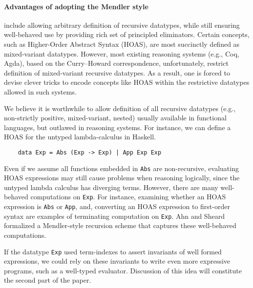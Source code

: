 \documentclass[a4paper]{easychair} %
\newcommand{\eg}[0]{{e.g.}}
\begin{document}
\paragraph{Advantages of adopting the Mendler style\!\!\!}
include allowing arbitrary definition of recursive datatypes, while still 
ensuring well-behaved use by providing rich set of principled eliminators.
Certain concepts, such as Higher-Order Abstract Syntax (HOAS), are
most succinctly defined as mixed-variant datatypes. However, most existing
reasoning systems (\eg, Coq, Agda), based on the Curry--Howard correspondence,
unfortunately, restrict definition of mixed-variant recursive datatypes.
As a result, one is forced to devise clever tricks \cite{PHOAS}
to encode concepts like HOAS within the restrictive datatypes allowed in such systems.

We believe it is worthwhile to allow definition of all recursive datatypes
(\eg, non-strictly positive, mixed-variant, nested)
usually available in functional languages, but outlawed in reasoning systems.
For instance, we can define a HOAS for the untyped lambda-calculus in Haskell.
\begin{verbatim}
    data Exp = Abs (Exp -> Exp) | App Exp Exp
\end{verbatim}
Even if we assume all functions embedded in \texttt{Abs} are non-recursive,
evaluating HOAS expressions may still cause problems when reasoning logically,
since the untyped lambda calculus has diverging terms. However, there are
many well-behaved computations on \texttt{Exp}. For instance, examining whether
an HOAS expression is \texttt{Abs} or \texttt{App}, and, converting an HOAS expression
to first-order syntax are examples of terminating computation on \texttt{Exp}.
Ahn and Sheard \cite{AhnShe11} formalized a Mendler-style recursion scheme
that captures these well-behaved computations.

If the datatype \texttt{Exp} used term-indexes to assert invariants of well
formed expressions, we could rely on these invariants to write even more expressive
programs, such as a well-typed evaluator. Discussion of this idea
will constitute the second part of the paper.
\vspace*{-1ex}
\end{document}
